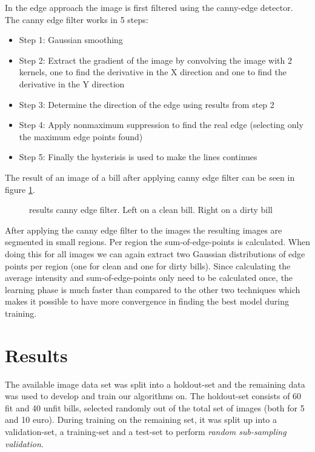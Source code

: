 \documentclass[11pt,twocolumn]{article}
\begin{document}
			In the edge approach the image is first filtered using the canny-edge detector. The canny edge filter works in 5 steps: 
			
			\begin{itemize} 
				\item Step 1: Gaussian smoothing 
				\item Step 2: Extract the gradient of the image by convolving the image with 2 kernels, one to find the derivative in the X direction and one to find the derivative in the Y direction				
				\item Step 3: Determine the direction of the edge using results from step 2  
				\item Step 4: Apply nonmaximum suppression to find the real edge (selecting only the maximum edge points found)
				\item Step 5: Finally the hysterisis is used to make the lines continues
            \end{itemize} 
            
            The result of an image of a bill after applying canny edge filter
            can be seen in figure \ref{canny5Euro}.
            
            \begin{figure}[!hbtp]
				\centering 
				\caption{results canny edge filter. Left on a clean bill. Right on a dirty
				bill} 
				\label{canny5Euro} 
			\end{figure} 
			
			After applying the canny edge filter to the images the resulting images are segmented in small regions. Per region the sum-of-edge-points is calculated. When doing this for all images we can again extract two Gaussian distributions of edge points per region (one for clean and one for dirty bills). Since calculating the average intensity and sum-of-edge-points only need to be calculated once, the learning phase is much faster than compared to the other two techniques which makes it possible to have more convergence in finding the best model during training.
			
	\section{Results}\label{sec:results}
		The available image data set was split into a holdout-set and the remaining data was used to develop and train our algorithms on. The holdout-set consists of 60 fit and 40 unfit bills, selected randomly out of the total set of images (both for 5 and 10 euro). During training on the remaining set, it was split up into a validation-set, a training-set and a test-set to perform \emph{random sub-sampling validation}.
\end{document}
